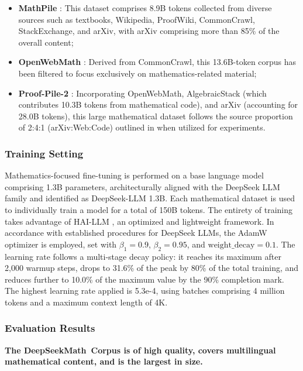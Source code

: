 \begin{itemize}[topsep=0pt]
\begin{itemize}[topsep=0pt]
    \item \textbf{MathPile} \citep{mathpile}: This dataset comprises 8.9B tokens collected from diverse sources such as textbooks, Wikipedia, ProofWiki, CommonCrawl, StackExchange, and arXiv, with arXiv comprising more than 85\% of the overall content;
    \item \textbf{OpenWebMath} \citep{openwebmath}: Derived from CommonCrawl, this 13.6B-token corpus has been filtered to focus exclusively on mathematics-related material;
    \item \textbf{Proof-Pile-2} \citep{llemma}: Incorporating OpenWebMath, AlgebraicStack (which contributes 10.3B tokens from mathematical code), and arXiv (accounting for 28.0B tokens), this large mathematical dataset follows the source proportion of 2:4:1 (arXiv:Web:Code) outlined in \cite{llemma} when utilized for experiments.
\end{itemize}

\subsubsection{Training Setting}
\label{sec:quality-policy}
Mathematics-focused fine-tuning is performed on a base language model comprising 1.3B parameters, architecturally aligned with the DeepSeek LLM family \citep{deepseek-llm} and identified as DeepSeek-LLM 1.3B. Each mathematical dataset is used to individually train a model for a total of 150B tokens. The entirety of training takes advantage of HAI-LLM \citep{haillm}, an optimized and lightweight framework. In accordance with established procedures for DeepSeek LLMs, the AdamW optimizer \citep{adamW} is employed, set with $\beta_1=0.9$, $\beta_2=0.95$, and $\mathrm{weight\_decay}=0.1$. The learning rate follows a multi-stage decay policy: it reaches its maximum after 2{,}000 warmup steps, drops to 31.6\% of the peak by 80\% of the total training, and reduces further to 10.0\% of the maximum value by the 90\% completion mark. The highest learning rate applied is 5.3e-4, using batches comprising 4 million tokens and a maximum context length of 4K.

\subsubsection{Evaluation Results}

\textbf{The DeepSeekMath~Corpus is of high quality, covers multilingual mathematical content, and is the largest in size.}


\end{itemize}
